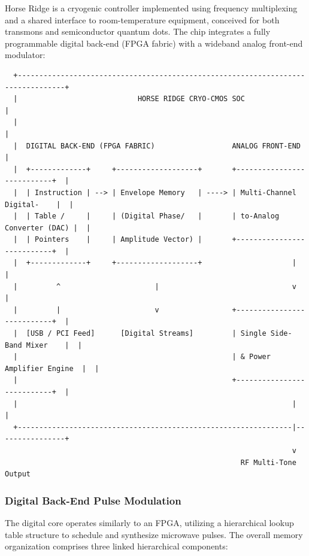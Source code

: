 \documentclass[
]{article}
\begin{document}
Horse Ridge is a cryogenic controller implemented using frequency
multiplexing and a shared interface to room-temperature equipment,
conceived for both transmons and semiconductor quantum dots. The chip
integrates a fully programmable digital back-end (FPGA fabric) with a
wideband analog front-end modulator:

\begin{verbatim}
  +---------------------------------------------------------------------------------+
  |                            HORSE RIDGE CRYO-CMOS SOC                            |
  |                                                                                 |
  |  DIGITAL BACK-END (FPGA FABRIC)                  ANALOG FRONT-END               |
  |  +-------------+     +-------------------+       +---------------------------+  |
  |  | Instruction | --> | Envelope Memory   | ----> | Multi-Channel Digital-    |  |
  |  | Table /     |     | (Digital Phase/   |       | to-Analog Converter (DAC) |  |
  |  | Pointers    |     | Amplitude Vector) |       +---------------------------+  |
  |  +-------------+     +-------------------+                     |                |
  |         ^                      |                               v                |
  |         |                      v                 +---------------------------+  |
  |  [USB / PCI Feed]      [Digital Streams]         | Single Side-Band Mixer    |  |
  |                                                  | & Power Amplifier Engine  |  |
  |                                                  +---------------------------+  |
  |                                                                |                |
  +----------------------------------------------------------------|----------------+
                                                                   v
                                                       RF Multi-Tone Output
\end{verbatim}

\subsubsection{Digital Back-End Pulse
Modulation}\label{digital-back-end-pulse-modulation}

The digital core operates similarly to an FPGA, utilizing a hierarchical
lookup table structure to schedule and synthesize microwave pulses. The
overall memory organization comprises three linked hierarchical
components:
\end{document}
